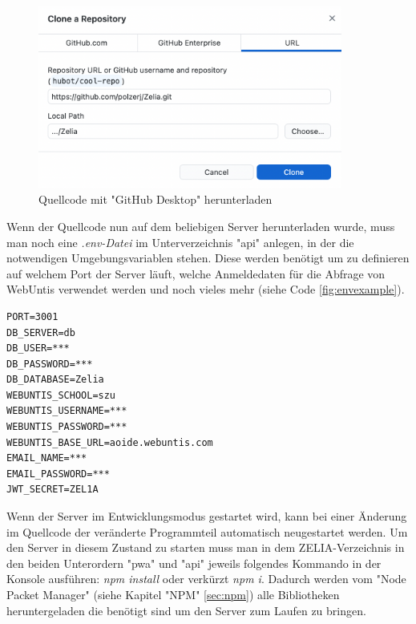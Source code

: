 \begin{figure}[H]
    \centering
    \includegraphics[width=100mm]{media/Handbuch/clone_gh.png}
    \caption{Quellcode mit "GitHub Desktop" herunterladen}
    \label{fig:clonewithdesktop}
\end{figure}


Wenn der Quellcode nun auf dem beliebigen Server herunterladen wurde, muss man noch eine \emph{.env-Datei} im Unterverzeichnis "api" anlegen, in der die notwendigen Umgebungsvariablen stehen. Diese werden benötigt um zu definieren auf welchem Port der Server läuft, welche Anmeldedaten für die Abfrage von WebUntis verwendet werden und noch vieles mehr (siehe Code \ref{fig:envexample}).


\begin{singlespace}
    \begin{lstlisting}[caption={Beispiel einer .env-Datei},label={fig:envexample},captionpos=b]
PORT=3001
DB_SERVER=db
DB_USER=***
DB_PASSWORD=***
DB_DATABASE=Zelia
WEBUNTIS_SCHOOL=szu
WEBUNTIS_USERNAME=***
WEBUNTIS_PASSWORD=***
WEBUNTIS_BASE_URL=aoide.webuntis.com
EMAIL_NAME=***
EMAIL_PASSWORD=***
JWT_SECRET=ZEL1A
    \end{lstlisting}
\end{singlespace}


Wenn der Server im Entwicklungsmodus gestartet wird, kann bei einer Änderung im Quellcode der veränderte Programmteil automatisch neugestartet werden. Um den Server in diesem Zustand zu starten muss man in dem ZELIA-Verzeichnis in den beiden Unterordern "pwa" und "api" jeweils folgendes Kommando in der Konsole ausführen: \emph{npm install} oder verkürzt \emph{npm i}. Dadurch werden vom "Node Packet Manager" (siehe Kapitel "NPM" \ref{sec:npm}) alle Bibliotheken heruntergeladen die benötigt sind um den Server zum Laufen zu bringen.

